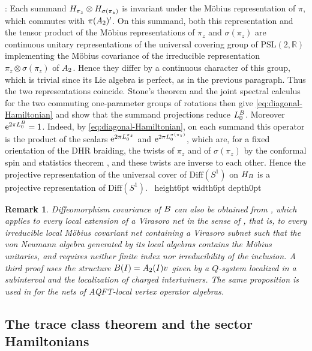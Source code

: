 \documentclass[leqno]{article}
\let\cal\relax
\newcommand{\cal}{\mathcal}
\newcommand{\R}{\ensuremath{\mathbb{R}}}
\newcommand{\qed}{\hfill \vrule height6pt  width6pt depth0pt}
\newcommand{\ot}{\otimes}
\let\i\relax
\newcommand{\i}{\mathrm{i}}
\newcommand{\e}{\mathrm{e}}
\newtheorem{remark}[thm]{Remark}
\newenvironment{proof}[1][]{\noindent {\it Proof #1} : }{\hbox{~}\qed
\smallskip
}
\numberwithin{equation}{section}
\begin{document}
\begin{proof}
Each summand $\cal H_{\pi_z} \ot \cal H_{\sigma(\pi_z)}$ is invariant under the M\"obius representation of $\pi$, which commutes with $\pi(\cal A_2)'$. On this summand, both this representation and the tensor product of the M\"obius representations of $\pi_z$ and $\sigma(\pi_z)$ are continuous unitary representations of the universal covering group of $\mathrm{PSL}(2,\R)$ implementing the M\"obius covariance of the irreducible representation $\pi_z \ot \sigma(\pi_z)$ of $\cal A_2$. Hence they differ by a continuous character of this group, which is trivial since its Lie algebra is perfect, as in the previous paragraph. Thus the two representations coincide. Stone's theorem and the joint spectral calculus for the two commuting one-parameter groups of rotations then give \eqref{eq:diagonal-Hamiltonian} and show that the summand projections reduce $L_0^{\cal B}$. Moreover $\e^{2\pi\i L_0^{\cal B}} = 1$. Indeed, by \eqref{eq:diagonal-Hamiltonian}, on each summand this operator is the product of the scalars $\e^{2\pi\i L_0^{\pi_z}}$ and $\e^{2\pi\i L_0^{\sigma(\pi_z)}}$, which are, for a fixed orientation of the DHR braiding, the twists of $\pi_z$ and of $\sigma(\pi_z)$ by the conformal spin and statistics theorem \cite{GuL96}, and these twists are inverse to each other. Hence the projective representation of the universal cover of $\mathrm{Diff}(S^1)$ on $\cal H_{\cal B}$ is a projective representation of $\mathrm{Diff}(S^1)$.
\end{proof}


\begin{remark}\normalfont
\label{rem:diff-covariance}
Diffeomorphism covariance of $\cal B$ can also be obtained from \cite[Proposition 3.7 p.~19]{Car04}, which applies to every local extension of a Virasoro net in the sense of \cite[Definition 3.1 p.~14]{Car04}, that is, to every irreducible local M\"obius covariant net containing a Virasoro subnet such that the von Neumann algebra generated by its local algebras contains the M\"obius unitaries, and requires neither finite index nor irreducibility of the inclusion. A third proof uses the structure $\cal B(I) = \cal A_2(I)v$ given by a $Q$-system localized in a subinterval \cite[Lemma 15 p.~14]{Lon03} and the localization of charged intertwiners. The same proposition is used in \cite[proof of Proposition 4.8 p.~28]{RTT22} for the nets of AQFT-local vertex operator algebras.
\end{remark}


\subsection{The trace class theorem and the sector Hamiltonians}
\label{subsec:hypothesis-D}
\end{document}
